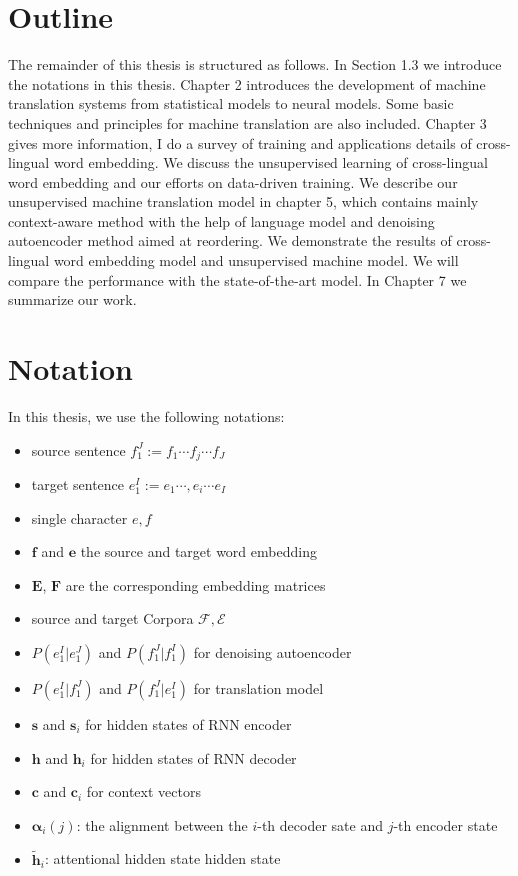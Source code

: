 \section{Outline}
The remainder of this thesis is structured as follows. In Section 1.3 we introduce the notations in this thesis. 
Chapter 2 introduces the development of machine translation systems from statistical models to  neural models. Some basic techniques and principles for machine translation are also included.  Chapter 3 gives more information,  I do a survey of training and applications details of cross-lingual word embedding. We discuss the unsupervised learning of cross-lingual word embedding and our efforts on data-driven training. We describe our unsupervised machine translation model in chapter 5, which contains mainly context-aware method with the help of language model and denoising autoencoder method aimed at reordering. We demonstrate the results of cross-lingual word embedding model and unsupervised machine model. We will compare the performance with the state-of-the-art model. In Chapter 7 we summarize our work.


\section{Notation}
In this thesis, we use the following notations:
\begin{itemize}
	\item source sentence  ${f_1^J:= f_1 \cdots  f_j \cdots f_J}$ 
	\item target sentence  ${e_1^I:= e_1 \cdots, e_i \cdots e_I}$
	\item single character $e,f $
	\item $\bm{f}$ and $\bm{e}$ the source and target word embedding
	\item $\bm{E}$, $\bm{F}$ are the corresponding embedding matrices
	\item source and target Corpora $\mathcal{F}, \mathcal{E}$
	\item $P(e_1^I | e_1^J)$ and ${P(f_1^J |f_1^I)}$ for denoising autoencoder
	\item $P(e_1^I | f_1^J)$ and ${P(f_1^J |e_1^I)}$ for translation model
	\item $\bm{s}$ and $\bm{s}_i$ for hidden states of RNN encoder
	\item $\bm{h}$ and $\bm{h}_i$ for hidden states of RNN decoder
	\item $\bm{c}$ and $\bm{c}_i$ for context vectors
	\item $\bm{\alpha}_i(j)$: the alignment between the $i$-th decoder sate and $j$-th encoder state
	\item $\tilde{\bm{h}}_i$:  attentional hidden state
	hidden state
\end{itemize}










